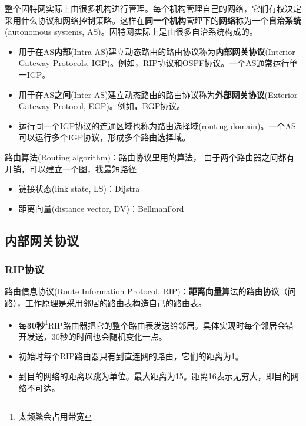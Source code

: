 整个因特网实际上由很多机构进行管理。每个机构管理自己的网络，它们有权决定采用什么协议和网络控制策略。这样在\textbf{同一个机构}管理下的\textbf{网络}称为一个\textbf{自治系统}(autonomous systems, AS)。因特网实际上是由很多自治系统构成的。
\begin{itemize}
	\item 用于在AS\textbf{内部}(Intra-AS)建立动态路由的路由协议称为\textbf{内部网关协议}(Interior Gateway Protocols, IGP)。例如，\underline{RIP协议}和\underline{OSPF协议}。一个AS通常运行单一IGP。
	\item 用于在AS\textbf{之间}(Inter-AS)建立动态路由的路由协议称为\textbf{外部网关协议}(Exterior Gateway Protocol, EGP)。例如，\underline{BGP协议}。
	\item 运行同一个IGP协议的连通区域也称为路由选择域(routing domain)。一个AS可以运行多个IGP协议，形成多个路由选择域。
\end{itemize}

路由算法(Routing algorithm)：路由协议里用的算法， 由于两个路由器之间都有开销，可以建立一个图，找最短路径
\begin{itemize}
	\item 链接状态(link state, LS)：Dijstra
	\item 距离向量(distance vector, DV)：BellmanFord
\end{itemize}

\subsection{内部网关协议}
\subsubsection{RIP协议}
路由信息协议(Route Information Protocol, RIP)：\textbf{距离向量}算法的路由协议（问路），工作原理是\underline{采用邻居的路由表构造自己的路由表}。
\begin{itemize}
	\item 每\textbf{30秒}\footnote{太频繁会占用带宽}RIP路由器把它的整个路由表发送给邻居。具体实现时每个邻居会错开发送，30秒的时间也会随机变化一点。
	\item 初始时每个RIP路由器只有到直连网的路由，它们的距离为1。
	\item 到目的网络的距离以跳为单位。最大距离为15。距离16表示无穷大，即目的网络不可达。
\end{itemize}

